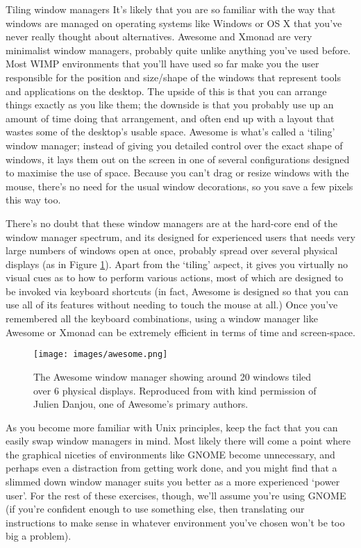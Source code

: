 \begin{diversion}{Tiling window managers}
It's likely that you are so familiar with the way that windows are managed on operating systems like Windows or OS X that you've never really thought about alternatives. 
Awesome and Xmonad are very minimalist window managers, probably quite unlike anything you've used before. Most WIMP environments that you'll have used so far make you the user responsible for the position and size/shape of the windows that represent tools and applications on the desktop. The upside of this is that you can arrange things exactly as you like them; the downside is that you probably use up an amount of time doing that arrangement, and often end up with a layout that wastes some of the desktop's usable space. Awesome is what's called a `tiling' window manager; instead of giving you detailed control over the exact shape of windows, it lays them out on the screen in one of several configurations designed to maximise the use of space. Because you can't drag or resize windows with the mouse, there's no need for the usual window decorations, so you save a few pixels this way too. 

There's no doubt that these window managers are at the hard-core end of the window manager spectrum, and its designed for experienced users that needs very large numbers of windows open at once, probably spread over several physical displays (as in Figure \ref{figure:awesome}). Apart from the `tiling' aspect, it gives you virtually no visual cues as to how to perform various actions, most of which are designed to be invoked via keyboard shortcuts (in fact, Awesome is designed so that you can use all of its features without needing to touch the mouse at all.) Once you've remembered all the keyboard combinations, using a window manager like Awesome or Xmonad can be extremely efficient in terms of time and screen-space.
\end{diversion}

\begin{figure}[htb]
  \begin{center}
    \texttt{[image: images/awesome.png]}
  \end{center}
\caption{The Awesome window manager showing around 20 windows tiled over 6 physical displays. Reproduced from  with kind permission of Julien Danjou, one of Awesome's primary authors.}
\label{figure:awesome}
\end{figure}

As you become more familiar with Unix principles, keep the fact that you can easily swap window managers in mind. Most likely there will come a point where the graphical niceties of environments like GNOME become unnecessary, and perhaps even a distraction from getting work done, and you might find that a slimmed down window manager suits you better as a more experienced `power user'. For the rest of these exercises, though, we'll assume you're using GNOME (if you're confident enough to use something else, then translating our instructions to make sense in whatever environment you've chosen won't be too big a problem). 

